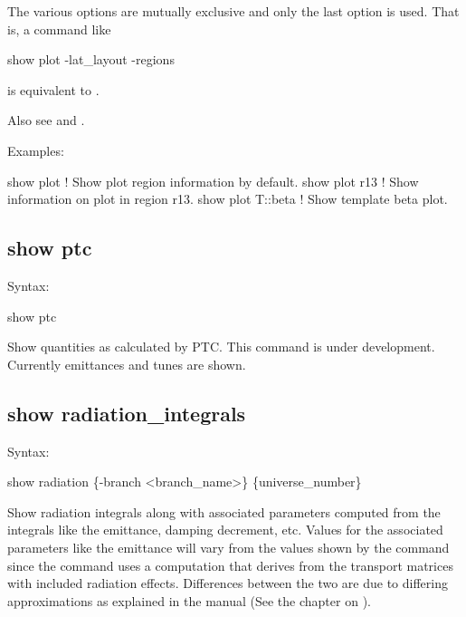 {{{{{{{{{{The various  options are mutually exclusive and only the last option is used. That is,
a command like
\begin{example}
  show plot -lat_layout -regions
\end{example}
is equivalent to .

Also see  and .

Examples:
\begin{example}
  show plot         ! Show plot region information by default.
  show plot r13     ! Show information on plot in region r13.
  show plot T::beta ! Show template beta plot.
\end{example}


\subsection{show ptc}
\label{s:show.ptc}

Syntax:
\begin{example}
  show ptc 
\end{example}

Show quantities as calculated by PTC. This command is under development. Currently emittances and
tunes are shown.


\subsection{show radiation_integrals}
\label{s:show.rad.int}

Syntax:
\begin{example}
  show radiation \{-branch <branch_name>\} \{universe_number\}
\end{example}

Show radiation integrals along with associated parameters computed from the integrals like the
emittance, damping decrement, etc. Values for the associated parameters like the emittance will vary
from the values shown by the  command since the  command uses a
computation that derives from the transport matrices with included radiation effects. Differences
between the two are due to differing approximations as explained in the \bmad manual (See the
chapter on ).

}}}}}}}}}}
